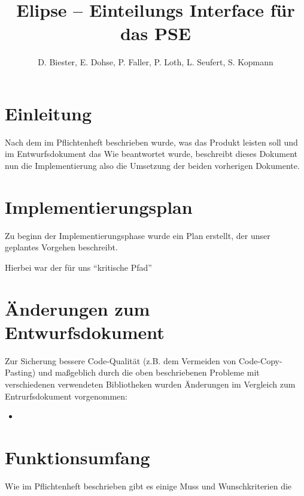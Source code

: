 \documentclass[parskip=full]{scrartcl}
\begin{document}
\title{Elipse -- Einteilungs Interface für das PSE}
\author{D. Biester, E. Dohse, P. Faller, P. Loth, L. Seufert, S. Kopmann}
\zweitgutachter{}
\mytitlepage
{\setlength{\textheight}{297mm}
\tableofcontents

\setlength{\textheight}{297mm}}
\pagebreak

\section{Einleitung}
Nach dem im Pflichtenheft beschrieben wurde, was das Produkt leisten soll und im
Entwurfsdokument das Wie beantwortet wurde, beschreibt dieses Dokument nun die
Implementierung also die Umsetzung der beiden vorherigen Dokumente. 

\section{Implementierungsplan}
Zu beginn der Implementierungsphase wurde ein Plan erstellt, der unser geplantes
Vorgehen beschreibt.

Hierbei war der für uns \enquote{kritische Pfad} %

%
\section{Änderungen zum Entwurfsdokument}
Zur Sicherung bessere Code-Qualität (z.B. dem Vermeiden von Code-Copy-Pasting)
und maßgeblich durch die oben beschriebenen Probleme mit verschiedenen
verwendeten Bibliotheken  wurden Änderungen im Vergleich zum  Entrurfsdokument
vorgenommen:
\begin{itemize}
  \item 
\end{itemize}

\section{Funktionsumfang}
Wie im Pflichtenheft beschrieben gibt es einige Muss und Wunschkriterien die 



\end{document}
